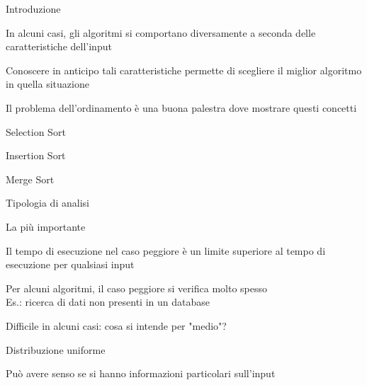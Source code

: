 \begin{frame}{Introduzione}

\vspace{-9pt}
\begin{myboxtitle}
\BI
\item In alcuni casi, gli algoritmi si comportano diversamente a seconda delle caratteristiche dell'input
\item Conoscere in anticipo tali caratteristiche permette di scegliere il miglior algoritmo in quella situazione
\item Il problema dell'ordinamento è una buona palestra dove mostrare questi concetti
\EI
\end{myboxtitle}

\begin{myboxtitle}
\BI
\item Selection Sort
\item Insertion Sort
\item Merge Sort
\EI
\end{myboxtitle}

\end{frame}



\begin{frame}{Tipologia di analisi}

\vspace{-9pt}
\begin{myboxtitle}
\BI
\item La più importante
\item Il tempo di esecuzione nel caso peggiore è un \alert{limite superiore} al tempo di esecuzione per qualsiasi input
\item Per alcuni algoritmi, il caso peggiore si verifica molto spesso\\
Es.: ricerca di dati non presenti in un database
\EI
\end{myboxtitle}
\smallskip
\begin{myboxtitle}
\BI
\item Difficile in alcuni casi: cosa si intende per "medio"?
\item Distribuzione uniforme
\EI
\end{myboxtitle}
\smallskip
\begin{myboxtitle}
\BI
\item Può avere senso se si hanno informazioni particolari sull'input
\EI
\end{myboxtitle}
\end{frame}

